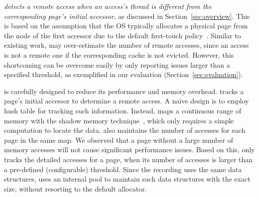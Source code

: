 \textit{\NP{} detects a remote access when an access's thread is different from the corresponding page's initial accessor}, as discussed in Section~\ref{sec:overview}. This is based on the assumption that the OS typically allocates a physical page from the node of the first accessor due to the default first-touch policy~\cite{firsttouch}.  Similar to existing work, \NP{} may over-estimate the number of remote accesses, since an access is not a remote one if the corresponding cache is not evicted. 
However, this shortcoming can be overcome easily by only reporting issues larger than a specified threshold, as exemplified in our evaluation (Section~\ref{sec:evaluation}).  

\NP{} is carefully designed to reduce its performance and memory overhead.  \NP{} tracks a page's initial accessor to determine a remote access. A naive design is to employ hash table for tracking such information. 
Instead, \NP{} maps a continuous range of memory with the shadow memory technique~\cite{qinzhao}, which only requires a simple computation to locate the data. 
\NP{} also maintains the number of accesses for each page in the same map. 
We observed that a page without a large number of memory accesses will not cause significant performance issues. Based on this, \NP{} only tracks the detailed accesses for a page, when its number of accesses is larger than a pre-defined (configurable) threshold. 
Since the recording uses the same data structures, \NP{} uses an internal pool to maintain such data structures with the exact size, without resorting to the default allocator.  


